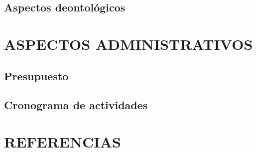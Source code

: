 \subsection{Aspectos deontológicos}

\section{ASPECTOS ADMINISTRATIVOS}
\subsection{Presupuesto}
\subsection{Cronograma de actividades}

\section{REFERENCIAS}

